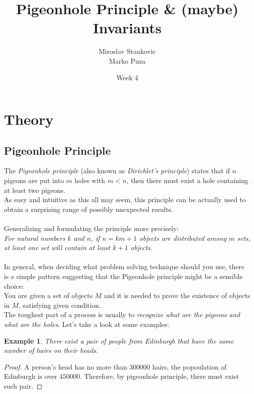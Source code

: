 \documentclass[12pt,a4paper]{article}
\title{\textbf{Pigeonhole Principle \& (maybe) Invariants}}
\date{Week 4}
\author{Miroslav Stankovic\\ Marko Puza}
\newtheorem{theorem}{Example}
\begin{document}
\maketitle

\section{Theory}
\subsection*{Pigeonhole Principle}
The \emph{Pigeonhole principle} (also known as \emph{Dirichlet's principle}) states that if $n$ pigeons are put into $m$ holes with $m < n$, then there must exist a hole containing at least two pigeons. \\
As easy and intuitive as this all may seem, this principle can be actually used to obtain a surprising range of possibly unexpected results.
\\\\
Generalizing and formulating the principle more precisely: \\
\emph{For natural numbers $k$ and $n$, if $n = km + 1$ objects are distributed among $m$ sets, at least one set will contain at least $k + 1$ objects.}
\\\\
In general, when deciding what problem solving technique should you use, there is a simple pattern suggesting that the Pigeonhole principle might be a sensible choice:\\
You are given a set of objects $M$ and it is needed to prove the existence of objects in $M$, satisfying given condition. \\
The toughest part of a process is usually to \emph{recognize what are the pigeons and what are the holes}. Let's take a look at some examples:

\begin{theorem}
There exist a pair of people from Edinburgh that have the same number of hairs on their heads.
\end{theorem}
\begin{proof}
A person's head has no more than $300 000$ hairs, the popoulation of Edinburgh is over $450 000$. Therefore, by pigeonhole principle, there must exist such pair.
\end{proof}
\end{document}
